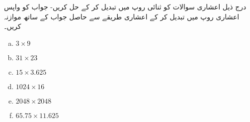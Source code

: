 درج ذیل اعشاری سوالات کو ثنائی روپ میں تبدیل کر کے حل کریں- جواب کو واپس اعشاری روپ میں تبدیل کر کے اعشاری طریقے سے حاصل جواب کے ساتھ موازنہ کریں۔
\begin{multicols}{4}
\begin{enumerate}[a.]
\item 
 \(3\times 9\)   
\item 
 \(31\times 23\)   
\item 
 \(15\times 3.625\)  
\item  
 \(1024\times 16\) 
\item 
 \(2048\times 2048\) 
\item 
 \(65.75\times 11.625\) 
\end{enumerate}
\end{multicols}

